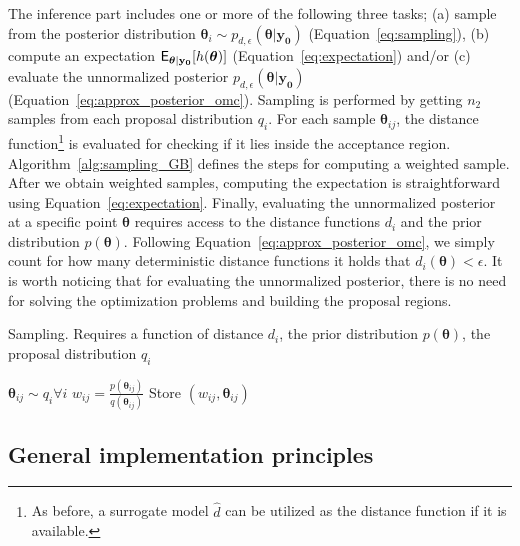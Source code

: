 \documentclass[nojss]{jss}
\newcommand{\thetab}{\boldsymbol{\theta}}
\newcommand{\data}{\mathbf{y_0}}
\begin{document}
The inference part includes one or more of the following three tasks;
(a) sample from the posterior distribution
\( \thetab_i \sim p_{d, \epsilon}(\thetab|\data)\)
(Equation~\ref{eq:sampling}), (b) compute an expectation
\(\E_{\thetab|\data}[h(\thetab)]\) (Equation~\ref{eq:expectation})
and/or (c) evaluate the unnormalized posterior
\(p_{d, \epsilon}(\thetab|\data)\)
(Equation~\ref{eq:approx_posterior_omc}). Sampling is performed by
getting \(n_2\) samples from each proposal distribution \(q_i\). For
each sample \(\thetab_{ij}\), the distance function\footnote{As
  before, a surrogate model \(\hat{d}\) can be utilized as the
  distance function if it is available.} is evaluated for checking if
it lies inside the acceptance region. Algorithm~\ref{alg:sampling_GB}
defines the steps for computing a weighted sample. After we obtain
weighted samples, computing the expectation is straightforward using
Equation~\ref{eq:expectation}. Finally, evaluating the unnormalized
posterior at a specific point \(\thetab\) requires access to the
distance functions \(d_i\) and the prior distribution
\(p(\thetab)\). Following Equation~\ref{eq:approx_posterior_omc}, we
simply count for how many deterministic distance functions it holds
that \(d_i(\thetab) < \epsilon\). It is worth noticing that for
evaluating the unnormalized posterior, there is no need for solving
the optimization problems and building the proposal regions.

\begin{algorithm}[H]
    \centering
    \caption{Sampling. Requires a function of distance \(d_i\), the prior distribution \(p(\thetab)\), the proposal distribution \(q_i\)}\label{alg:sampling_GB}
    \begin{algorithmic}[1]
      \State \(\thetab_{ij} \sim q_i \forall i\) 
          \If {\(d_i(\thetab_{ij}) \leq \epsilon\)} 
            \State \(w_{ij} = \frac{p(\thetab_{ij})}{q(\thetab_{ij})}\) 
            \State Store \((w_{ij}, \thetab_{ij})\) 
            \EndIf
            \EndFor
    \EndFor
    \end{algorithmic}
\end{algorithm}


\subsection{General implementation principles}
\label{subsec:general_design}
\end{document}
